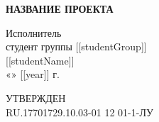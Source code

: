 \documentclass[12pt]{article}
\begin{document}
\begin{center}
    \textbf{НАЗВАНИЕ ПРОЕКТА}
\end{center}
\begin{center}
    \textbf{\fontsize{14pt}{14pt}\selectfont{Текст программы}}
\end{center}
\begin{center}
    \textbf{\fontsize{14pt}{14pt}\selectfont{ЛИСТ УТВЕРЖДЕНИЯ}}
\end{center}
\begin{center}
    \textbf{\fontsize{14pt}{14pt}\selectfont{RU.17701729.10.03-01 12 01-1-ЛУ}}
\end{center}

\vspace*{\fill}
\begin{minipage}{\textwidth}
    \begin{multicols*}{2}{
    \begin{center}
    \end{center}
    \columnbreak
    \begin{center}{
        Исполнитель \\ 
        студент группы [[studentGroup]] \\
        \underline{\hspace{3cm}} [[studentName]] \\
        «\underline{\hspace{0.5cm}}»\underline{\hspace{2cm}} [[year]] г.
    }\end{center}
}
\end{multicols*}
\end{minipage}

\vspace*{\fill}
\begin{center}
    \textbf{\fontsize{14pt}{14pt}\selectfont{Москва [[year]]}}
\end{center}

\newpage
\thispagestyle{empty}
\begin{minipage}{0.5\textwidth}
\begin{center}
        УТВЕРЖДЕН \\
RU.17701729.10.03-01 12 01-1-ЛУ
\end{center}
\end{minipage}
\end{document}
